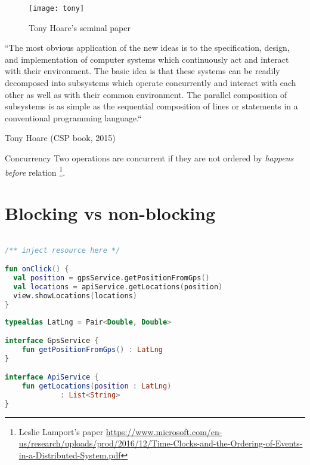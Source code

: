 \documentclass[10pt]{beamer}
\begin{document}
\begin{frame}[fragile]
	\begin{figure}
		\texttt{[image: tony]}
		\caption{Tony Hoare's seminal paper}
	\end{figure}
\end{frame}
\begin{frame}[fragile]
``The most obvious application of the new ideas is to the specification, design,
and implementation of computer systems which continuously act and
interact with their environment. The basic idea is that these systems can be
readily decomposed into subsystems which operate concurrently and interact
with each other as well as with their common environment. The parallel composition
of subsystems is as simple as the sequential composition of lines or
statements in a conventional programming language.``

	Tony Hoare (CSP book, 2015)
\end{frame}



\begin{frame}[fragile]
	\begin{alertblock}{Concurrency}
		Two operations are concurrent if they are not ordered by \emph{happens before} relation%
		\footnote{Leslie Lamport's paper \url{https://www.microsoft.com/en-us/research/uploads/prod/2016/12/Time-Clocks-and-the-Ordering-of-Events-in-a-Distributed-System.pdf}}.
	\end{alertblock}
	

\end{frame}
\section{Blocking vs non-blocking}
\begin{frame}[fragile]
\begin{lstlisting}[language=Kotlin, basicstyle=\ttfamily]

/** inject resource here */

fun onClick() {
  val position = gpsService.getPositionFromGps()
  val locations = apiService.getLocations(position)
  view.showLocations(locations)
}
\end{lstlisting}
\end{frame}
\begin{frame}[fragile]
\begin{lstlisting}[language=Kotlin, basicstyle=\ttfamily]
typealias LatLng = Pair<Double, Double>

interface GpsService { 
    fun getPositionFromGps() : LatLng
}

interface ApiService { 
    fun getLocations(position : LatLng) 
             : List<String>
}
\end{lstlisting}
\end{frame}
\end{document}
